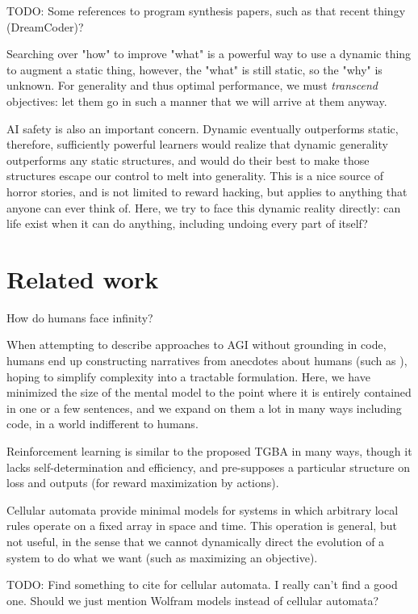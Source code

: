 \documentclass{article}
\begin{document}
        TODO: Some references to program synthesis papers, such as that recent thingy (DreamCoder)?

Searching over "how" to improve "what" is a powerful way to use a dynamic thing to augment a static thing, however, the "what" is still static, so the "why" is unknown. For generality and thus optimal performance, we must \textit{transcend} objectives: let them go in such a manner that we will arrive at them anyway.

AI safety is also an important concern. Dynamic eventually outperforms static, therefore, sufficiently powerful learners would realize that dynamic generality outperforms any static structures, and would do their best to make those structures escape our control to melt into generality. This is a nice source of horror stories, and is not limited to reward hacking, but applies to anything that anyone can ever think of. Here, we try to face this dynamic reality directly: can life exist when it can do anything, including undoing every part of itself?

\section{Related work}

How do humans face infinity?

When attempting to describe approaches to AGI without grounding in code, humans end up constructing narratives from anecdotes about humans (such as \cite{DBLP:journals/corr/abs-2102-03406}), hoping to simplify complexity into a tractable formulation. Here, we have minimized the size of the mental model to the point where it is entirely contained in one or a few sentences, and we expand on them a lot in many ways including code, in a world indifferent to humans.

Reinforcement learning is similar to the proposed TGBA in many ways, though it lacks self-determination and efficiency, and pre-supposes a particular structure on loss and outputs (for reward maximization by actions).

Cellular automata provide minimal models for systems in which arbitrary local rules operate on a fixed array in space and time. This operation is general, but not useful, in the sense that we cannot dynamically direct the evolution of a system to do what we want (such as maximizing an objective).

    TODO: Find something to cite for cellular automata. I really can't find a good one. Should we just mention Wolfram models instead of cellular automata?
\end{document}
